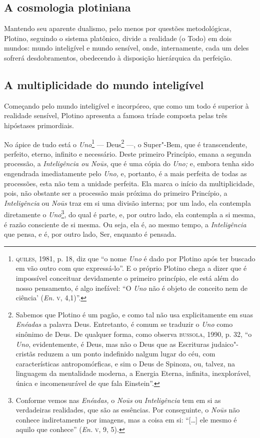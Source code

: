 \subsection{A cosmologia plotiniana}

Mantendo seu aparente dualismo, pelo menos por questões
metodológicas, Plotino, seguindo o sistema platônico, divide a
realidade (o Todo) em dois mundos: mundo inteligível e mundo
sensível, onde, internamente, cada um  deles sofrerá
desdobramentos, obedecendo à disposição hierárquica da
perfeição.

\subsection{A multiplicidade do mundo inteligível}

Começando pelo mundo inteligível e incorpóreo, que como um todo é
superior à realidade sensível, Plotino apresenta a famosa tríade
composta pelas três hipóstases primordiais.

No ápice de tudo está o \emph{Uno}\footnote{ \textsc{quiles}, 1981, p.
18, diz que “o nome \emph{Uno} é dado por Plotino após ter
buscado em vão outro com que expressá-lo”. E o próprio Plotino
chega a dizer que é impossível conceituar devidamente o primeiro
princípio, ele está além do nosso pensamento, é algo inefável:
``O \emph{Uno} não é objeto de conceito nem de ciência'
(\emph{En.} \textsc{v}, 4,1)”.}  --- Deus\footnote{ Sabemos que Plotino é
um pagão, e como tal não usa explicitamente em suas
\emph{Enéadas} a palavra Deus. Entretanto, é comum se traduzir
o \emph{Uno} como sinônimo de Deus. De qualquer forma, como
observa \textsc{bussola}, 1990, p. 32, “o \emph{Uno}, evidentemente, é
Deus, mas não o Deus que as Escrituras judaico"-cristãs reduzem a
um ponto indefinido nalgum lugar do céu, com características
antropomórficas, e sim o Deus de Spinoza, ou, talvez, na
linguagem da mentalidade moderna, a Energia Eterna, infinita,
inexplorável, única e incomensurável de que fala Einstein”.} ---,
o Super"-Bem,  que é transcendente, perfeito, eterno, infinito e
necessário. Deste primeiro Princípio, emana a segunda processão,
a \emph{Inteligência ou Noūs}, que é uma cópia do \emph{Uno;}
e, embora tenha sido engendrada imediatamente pelo \emph{Uno,}
e, portanto,  é a mais perfeita de todas as processões, esta
não tem a unidade perfeita. Ela marca o início da
multiplicidade, pois, não obstante ser a processão mais próxima
do primeiro Princípio\emph{,} a \emph{Inteligência} ou
\emph{Noūs} traz em si uma divisão interna; por um lado, ela
contempla diretamente o \emph{Uno}\footnote{ Conforme vemos
nas \emph{Enéadas,} o \emph{Noūs} ou \emph{Inteligência}
tem em si as verdadeiras realidades, que são as essências. Por
conseguinte, o \emph{Noūs} não conhece indiretamente por
imagens, mas a coisa em si: “[\ldots{}] ele mesmo é aquilo que
conhece” (\emph{En.} \textsc{v}, 9, 5).},  do qual é parte, e,
por outro lado, ela contempla a si mesma, é razão consciente de
si mesma. Ou seja, ela é, ao mesmo tempo, a \emph{Inteligência}
que pensa, e é, por outro lado, Ser, enquanto é pensada. 

